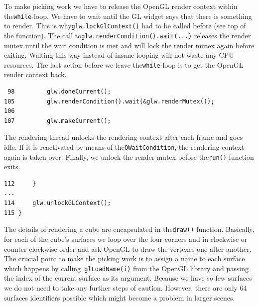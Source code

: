 \documentclass[prodmode,acmtopc]{acmsmall}
\begin{document}
To make picking work we have to release the OpenGL render context within the\lstinline|while|-loop.
%
We have to wait until the GL widget says that there is something to render. 
%
This is why\lstinline|glw.lockGlContext()| had to be called before (see top of the function).
%
The call to\lstinline|glw.renderCondition().wait(...)| releases the render mutex until the wait condition is met
 and will lock the render mutex again before exiting.
Waiting this way instead of insane looping will not waste any CPU resources.
 The last action before we leave the\lstinline|while|-loop is to get the OpenGL render context back.
%
\begin{lstlisting}
 98         glw.doneCurrent(); 
105         glw.renderCondition().wait(&glw.renderMutex());
106
107         glw.makeCurrent(); 
\end{lstlisting}
%
%
The rendering thread unlocks the rendering context after each frame and goes idle.
%
If it is reactivated by means of the\lstinline|QWaitCondition|, the rendering context again is taken over.
%
Finally, we unlock the render mutex before the\lstinline|run()| function exits.
\begin{lstlisting}
112     }
...
114     glw.unlockGLContext();
115 }
\end{lstlisting}
%
The details of rendering a cube are encapsulated in the\lstinline|draw()| function. 
%
Basically, for each of the cube's surfaces we loop over the four corners and in clockwise or counter-clockwise order and ask OpenGL to draw the vertexes one after another.
%
The crucial point to make the picking work is to assign a name to each surface which happens by calling\lstinline| glLoadName(i)| from the OpenGL library and passing the index of the current surface as its argument.
%
Because we have so few surfaces we do not need to take any further steps of caution. 
%
However, there are only 64 surfaces identifiers possible which might become a problem in larger scenes. 
\end{document}
